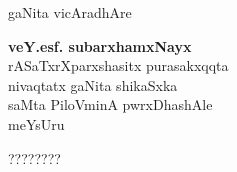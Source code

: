\thispagestyle{empty}
\begin{center}
{\fontsize{30}{32}\selectfont gaNita vicAradhAre}
\vfill


{\LARGE\bfseries veY.esf. subarxhamxNayx}\\[4pt]
   {\large rASaTxrXparxshasitx purasakxqqta\\[4pt]
   nivaqtatx gaNita shikaSxka\\[4pt]
   saMta PiloVminA pwrxDhashAle\\[4pt]
   meYsUru}

\vfill


????????

\end{center}
